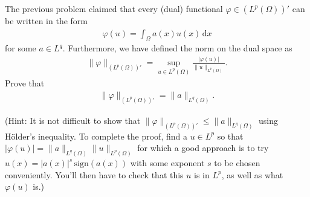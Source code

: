 \documentclass[12pt]{memoir}
\begin{document}
\begin{Ej}
    The previous problem claimed that every (dual) functional $\varphi\in (L^p(\Omega))'$
can be written in the form
\begin{align*}
  \varphi(u) = \int_\Omega a(x) u(x) \, \text{d}x
\end{align*}
for some $a\in L^q$. Furthermore, we have defined the norm on the dual
space as
\begin{align*}
  \|\varphi\|_{(L^p(\Omega))'} =
  \sup_{u\in L^p(\Omega)} \frac{|\varphi(u)|}{\|u\|_{L^p(\Omega)}}.
\end{align*}
Prove that
\begin{align*}
  \|\varphi\|_{(L^p(\Omega))'} = \|a\|_{L^q(\Omega)}.
\end{align*}

(Hint: It is not difficult to show that $\|\varphi\|_{(L^p(\Omega))'}
\le \|a\|_{L^q(\Omega)}$ using H\"older's inequality. To complete the proof, find a $u\in L^p$ so
  that $|\varphi(u)|=\|a\|_{L^q(\Omega)}\|u\|_{L^p(\Omega)}$ for which
  a good approach is to try $u(x)=|a(x)|^s \,\text{sign}(a(x))$ with some exponent $s$ to
  be chosen conveniently. You'll then have to check that this $u$ is
  in $L^p$, as well as what $\varphi(u)$ is.)
\end{Ej}
\end{document}
